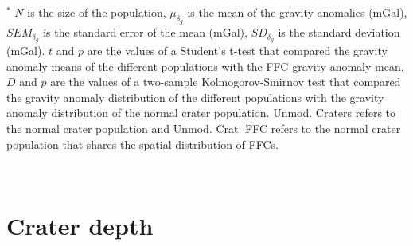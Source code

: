 \begin{table}[h!]
{\begin{tabular}
{\begin{minipage}{18.5cm}
        \vspace{.1cm}  \footnotesize  $^*$  $N$  is the  size  of  the
        population,  $\mu_{\delta_g}$  is  the  mean  of  the  gravity
        anomalies (mGal),  $SEM_{\delta_g}$ is  the standard  error of
        the  mean (mGal),  $SD_{\delta_g}$ is  the standard  deviation
        (mGal).  $t$ and $p$ are the values of a Student's t-test that
        compared   the  gravity   anomaly  means   of  the   different
        populations with  the FFC gravity  anomaly mean.  $D$  and $p$
        are the  values of  a two-sample Kolmogorov-Smirnov  test that
        compared  the gravity  anomaly distribution  of the  different
        populations  with  the  gravity anomaly  distribution  of  the
        normal  crater  population.   Unmod.  Craters  refers  to  the
        normal crater population  and Unmod. Crat.  FFC  refers to the
        normal crater population that  shares the spatial distribution
        of FFCs.
      \end{minipage}
      }\\
    \end{tabular}}
    \label{Table3-1}
  \end{table}

\section{Crater depth}
\label{sec:crater-depth}


